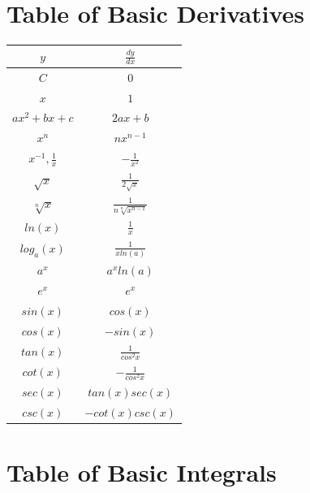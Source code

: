 \documentclass[12pt, letterpaper]{article}
\begin{document}
\section{Table of Basic Derivatives}
\begin{center}
\begin{tabular}{|c|c|}
\hline
$y$ & $\frac{dy}{dx}$\\
\hline
$C$ & $0$\\
\hline
$x$ & $1$\\
\hline
$ax^2 + bx + c$ & $2ax+b$\\
\hline
$x^n$ & $nx^{n-1}$\\
\hline
$x^{-1}, \frac{1}{x}$ & $-\frac{1}{x^2}$\\
\hline
$\sqrt{x}$ & $\frac{1}{2\sqrt{x}}$\\
\hline
$\sqrt[n]{x}$ & $\frac{1}{n\sqrt[n]{x^{n-1}}}$\\
\hline
$ln(x)$ & $\frac{1}{x}$\\
\hline
$log_a (x)$ & $\frac{1}{x ln(a)}$\\
\hline
$a^x$ & $a^x ln (a)$\\
\hline
$e^x$ & $e^x$\\
\hline
$sin(x)$ & $cos(x)$\\
\hline
$cos(x)$ & $-sin(x)$\\
\hline
$tan(x)$ & $\frac{1}{cos^2 x}$\\
\hline
$cot(x)$ & $-\frac{1}{cos^2 x}$\\
\hline
$sec(x)$ & $tan(x) sec(x)$\\
\hline
$csc(x)$ & $-cot(x) csc(x)$\\
\hline
\end{tabular}
\end{center}

\section{Table of Basic Integrals}
\end{document}
